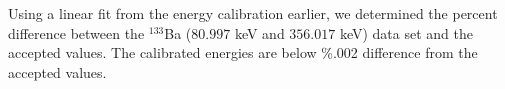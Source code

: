 
Using a linear fit from the energy calibration earlier, we determined the percent difference between the $^{133}$Ba ($80.997$ keV and $356.017$ keV)
data set and the accepted values.
The calibrated energies are below \%.002 difference from the accepted values.


